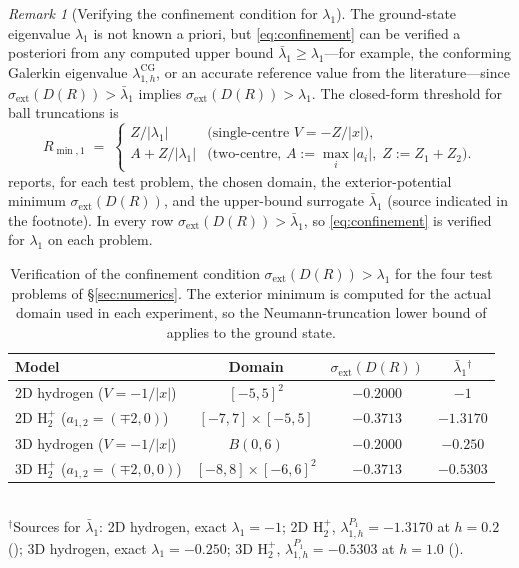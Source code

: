 \documentclass[11pt]{article}
\theoremstyle{plain}
\theoremstyle{definition}
\theoremstyle{remark}
\newtheorem{remark}{Remark}
\newcommand{\CG}{\mathrm{CG}}
\begin{document}
\begin{remark}[Verifying the confinement condition for
\texorpdfstring{$\lambda_1$}{lambda\_1}]
\label{rmk:confinement-verify}
The ground-state eigenvalue $\lambda_1$ is not known a priori,
but \eqref{eq:confinement} can be verified a posteriori from
any computed upper bound $\bar\lambda_1\ge\lambda_1$---for
example, the conforming Galerkin eigenvalue
$\lambda_{1,h}^{\CG}$, or an accurate reference value from the
literature---since $\sigma_{\mathrm{ext}}(D(R))>\bar\lambda_1$
implies $\sigma_{\mathrm{ext}}(D(R))>\lambda_1$. The closed-form
threshold for ball truncations is
\begin{equation}
\label{eq:R-min}
  R_{\min,1} \;=\;
  \begin{cases}
    Z/|\lambda_1| & \text{(single-centre } V=-Z/|x|\text{)}, \\
    A+Z/|\lambda_1| &
      \text{(two-centre, } A:=\max_i|a_i|,\;Z:=Z_1+Z_2\text{)}.
  \end{cases}
\end{equation}
 reports, for each test problem,
the chosen domain, the exterior-potential minimum
$\sigma_{\mathrm{ext}}(D(R))$, and the upper-bound surrogate
$\bar\lambda_1$ (source indicated in the footnote). In every
row $\sigma_{\mathrm{ext}}(D(R))>\bar\lambda_1$, so
\eqref{eq:confinement} is verified for $\lambda_1$ on each
problem.

\begin{table}[htbp]
\centering\small
\renewcommand{\arraystretch}{1.2}
\caption{Verification of the confinement condition
$\sigma_{\mathrm{ext}}(D(R))>\lambda_1$ for the four test problems
of \S\ref{sec:numerics}. The exterior minimum is computed for the
actual domain used in each experiment, so the Neumann-truncation
lower bound of  applies to the ground state.}
\label{tab:confinement-check}
\begin{tabular}{lccc}
\toprule
Model & Domain & $\sigma_{\mathrm{ext}}(D(R))$
      & $\bar\lambda_1{}^{\dagger}$ \\
\midrule
2D hydrogen ($V=-1/|x|$) & $[-5,5]^2$ & $-0.2000$ & $-1$      \\
2D $\mathrm{H}_2^+$ ($a_{1,2}=(\mp 2,0)$) & $[-7,7]\!\times\![-5,5]$ & $-0.3713$ & $-1.3170$ \\
3D hydrogen ($V=-1/|x|$) & $B(0,6)$ & $-0.2000$ & $-0.250$ \\
3D $\mathrm{H}_2^+$ ($a_{1,2}=(\mp 2,0,0)$) & $[-8,8]\!\times\![-6,6]^2$ & $-0.3713$ & $-0.5303$ \\
\bottomrule
\end{tabular}
\\[0.4em]
{\footnotesize $^{\dagger}$Sources for $\bar\lambda_1$:
2D hydrogen, exact $\lambda_1=-1$; 2D $\mathrm{H}_2^+$,
$\lambda_{1,h}^{P_1}=-1.3170$ at $h=0.2$ ();
3D hydrogen, exact $\lambda_1=-0.250$; 3D $\mathrm{H}_2^+$,
$\lambda_{1,h}^{P_1}=-0.5303$ at $h=1.0$ ().}
\end{table}
\end{remark}
\end{document}
